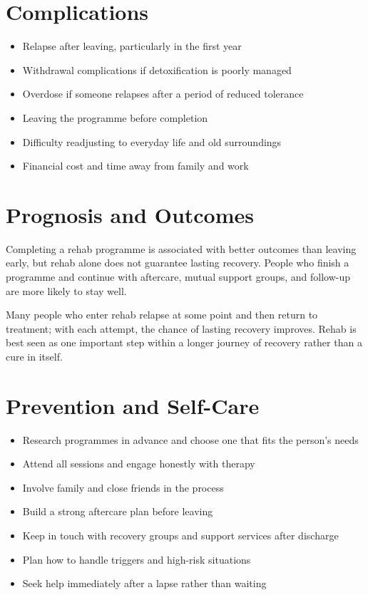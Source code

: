 \section*{Complications}
\begin{itemize}
    \item Relapse after leaving, particularly in the first year
    \item Withdrawal complications if detoxification is poorly managed
    \item Overdose if someone relapses after a period of reduced tolerance
    \item Leaving the programme before completion
    \item Difficulty readjusting to everyday life and old surroundings
    \item Financial cost and time away from family and work
\end{itemize}

\section*{Prognosis and Outcomes}
Completing a rehab programme is associated with better outcomes than leaving early, but rehab alone does not guarantee lasting recovery. People who finish a programme and continue with aftercare, mutual support groups, and follow-up are more likely to stay well.

Many people who enter rehab relapse at some point and then return to treatment; with each attempt, the chance of lasting recovery improves. Rehab is best seen as one important step within a longer journey of recovery rather than a cure in itself.

\section*{Prevention and Self-Care}
\begin{itemize}
    \item Research programmes in advance and choose one that fits the person's needs
    \item Attend all sessions and engage honestly with therapy
    \item Involve family and close friends in the process
    \item Build a strong aftercare plan before leaving
    \item Keep in touch with recovery groups and support services after discharge
    \item Plan how to handle triggers and high-risk situations
    \item Seek help immediately after a lapse rather than waiting
\end{itemize}

